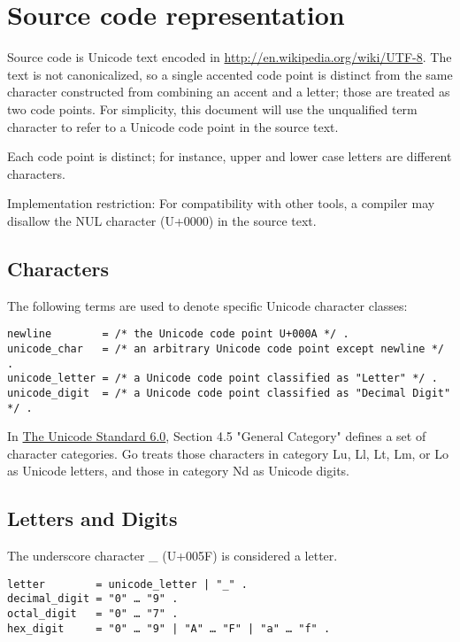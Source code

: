 \documentclass{article}
\begin{document}
\section*{Source code representation}
Source code is Unicode text encoded in
\href{UTF-8}{http://en.wikipedia.org/wiki/UTF-8}. The text is
not canonicalized, so a single accented code point is distinct from
the same character constructed from combining an accent and a letter;
those are treated as two code points. For simplicity, this document
will use the unqualified term character to refer to a Unicode code
point in the source text.

Each code point is distinct; for instance, upper and lower case
letters are different characters.

Implementation restriction: For compatibility with other tools, a
compiler may disallow the NUL character (U+0000) in the source text.

\subsection*{Characters}
The following terms are used to denote specific Unicode character
classes:

\begin{Verbatim}[frame=single]
newline        = /* the Unicode code point U+000A */ .
unicode_char   = /* an arbitrary Unicode code point except newline */ .
unicode_letter = /* a Unicode code point classified as "Letter" */ .
unicode_digit  = /* a Unicode code point classified as "Decimal Digit" */ .
\end{Verbatim}

In \href{http://www.unicode.org/versions/Unicode6.0.0/}{The Unicode Standard 6.0},
Section 4.5 "General Category" defines a set of character categories.
Go treats those characters in category Lu, Ll, Lt, Lm, or Lo as
Unicode letters, and those in category Nd as Unicode digits.

\subsection*{Letters and Digits}
The underscore character \_ (U+005F) is considered a letter.

\begin{Verbatim}[frame=single]
letter        = unicode_letter | "_" .
decimal_digit = "0" … "9" .
octal_digit   = "0" … "7" .
hex_digit     = "0" … "9" | "A" … "F" | "a" … "f" .
\end{Verbatim}
\end{document}
